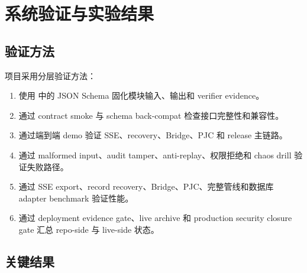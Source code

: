 \documentclass[UTF8,a4paper,12pt,oneside]{ctexrep}
\newcommand{\filepath}[1]{\path{#1}}
\begin{document}
\chapter{系统验证与实验结果}

\section{验证方法}

项目采用分层验证方法：

\begin{enumerate}
  \item 使用 \filepath{schemas/} 中的 JSON Schema 固化模块输入、输出和 verifier evidence。
  \item 通过 contract smoke 与 schema back-compat 检查接口完整性和兼容性。
  \item 通过端到端 demo 验证 SSE、recovery、Bridge、PJC 和 release 主链路。
  \item 通过 malformed input、audit tamper、anti-replay、权限拒绝和 chaos drill 验证失败路径。
  \item 通过 SSE export、record recovery、Bridge、PJC、完整管线和数据库 adapter benchmark 验证性能。
  \item 通过 deployment evidence gate、live archive 和 production security closure gate 汇总 repo-side 与 live-side 状态。
\end{enumerate}

\section{关键结果}
\end{document}
